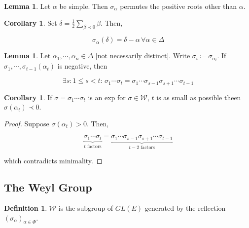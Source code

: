 \documentclass{article}
\theoremstyle{definition}
\newtheorem*{definition}{Definition}
\newtheorem{lemma}[theorem]{Lemma}
\newtheorem{corollary}[theorem]{Corollary}
\begin{document}
\begin{lemma}
    Let \(\alpha\) be simple. Then \(\sigma_\alpha\) permutes the positive roots other than \(\alpha\).
\end{lemma}

\begin{corollary}
    Set \(\delta = \frac{1}{2} \sum_{\beta \prec 0} \beta\). Then,

    \[
        \sigma_\alpha (\delta) = \delta - \alpha \,\forall \alpha \in \Delta
    \]
\end{corollary}

\begin{lemma}
    Let \(\alpha_1, \cdots , \alpha_n \in \Delta\) [not necessarily distinct]. Write \(\sigma_i \coloneqq \sigma_{\alpha_i}\). If \(\sigma_1 , \cdots , \sigma_{t-1}(\alpha_t)\) is negative, then
    
    \[
        \exists s : 1 \leq s < t:\, \sigma_1 \cdots  \sigma_t = \sigma_1 \cdots \sigma_{s-1} \sigma_{s+1}\cdots \sigma _{t-1}
    \]


\end{lemma}

\begin{corollary}
    If \(\sigma = \sigma_1 \cdots \sigma_t\) is an exp for \(\sigma \in \mathcal{W}\), \(t\) is as small as possible theen \(\sigma(\alpha_t) \prec 0\).
\end{corollary}

\begin{proof}
    Suppose \(\sigma(\alpha_t) > 0\). Then,

    \[
        \underbrace{\sigma_1 \cdots \sigma_t}_{t \text{ factors}} = \underbrace{\sigma_1 \cdots \sigma_{s-1}\sigma_{s+1}\cdots \sigma_{t-1}}_{t-2 \text{ factors}}
    \]

    which contradicts minimality.
\end{proof}

\subsection*{The Weyl Group}

\begin{definition}
    \(\mathcal{W}\) is the subgroup of \(GL(E)\) generated by the reflection \((\sigma_\alpha)_{\alpha \in \Phi}\).
\end{definition}
\end{document}
